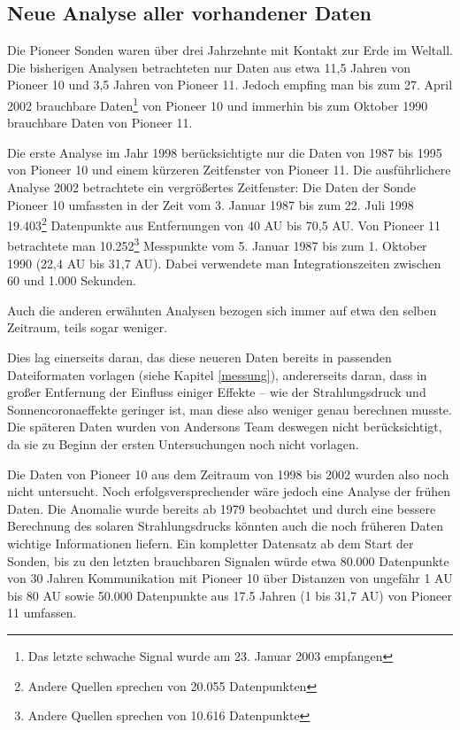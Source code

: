 \subsection{Neue Analyse aller vorhandener Daten}\label{daten}
Die Pioneer Sonden waren über drei Jahrzehnte mit Kontakt zur Erde im Weltall. Die bisherigen Analysen betrachteten nur Daten aus etwa 11,5 Jahren von Pioneer 10 und 3,5 Jahren von Pioneer 11. Jedoch empfing man bis zum 27. April 2002 brauchbare Daten\footnote{Das letzte schwache Signal wurde am 23. Januar 2003 empfangen} von Pioneer 10 und immerhin bis zum Oktober 1990 brauchbare Daten von Pioneer 11.

Die erste Analyse im Jahr 1998 berücksichtigte nur die Daten von 1987 bis 1995 von Pioneer 10 und einem kürzeren Zeitfenster von Pioneer 11. Die ausführlichere Analyse 2002 betrachtete ein vergrößertes Zeitfenster: Die Daten der Sonde Pioneer 10 umfassten in der Zeit vom 3. Januar 1987 bis zum 22. Juli 1998 19.403\footnote{Andere Quellen sprechen von 20.055 Datenpunkten\cite{Turyshev2004}} Datenpunkte aus Entfernungen von 40 AU bis 70,5 AU. Von Pioneer 11 betrachtete man 10.252\footnote{Andere Quellen sprechen von 10.616 Datenpunkte\cite{Turyshev2004}} Messpunkte vom 5. Januar 1987 bis zum 1. Oktober 1990 (22,4 AU bis 31,7 AU). %
Dabei verwendete man Integrationszeiten zwischen 60 und 1.000 Sekunden\cite{Turyshev2004}.

Auch die anderen erwähnten Analysen bezogen sich immer auf etwa den selben Zeitraum, teils sogar weniger.

Dies lag einerseits daran, das diese neueren Daten bereits in passenden Dateiformaten vorlagen (siehe Kapitel \ref{messung}), andererseits daran, dass in großer Entfernung der Einfluss einiger Effekte – wie der Strahlungsdruck und Sonnencoronaeffekte geringer ist, man diese also weniger genau berechnen musste\cite{Nieto2005}. Die späteren Daten wurden von Andersons Team deswegen nicht berücksichtigt, da sie zu Beginn der ersten Untersuchungen noch nicht vorlagen. %

Die Daten von Pioneer 10 aus dem Zeitraum von 1998 bis 2002 wurden also noch nicht untersucht.
Noch erfolgsversprechender wäre jedoch eine Analyse der frühen Daten. Die Anomalie wurde bereits ab 1979 beobachtet und durch eine bessere Berechnung des solaren Strahlungsdrucks könnten auch die noch früheren Daten wichtige Informationen liefern.
Ein kompletter Datensatz ab dem Start der Sonden, bis zu den letzten brauchbaren Signalen würde etwa 80.000 Datenpunkte von 30 Jahren Kommunikation mit Pioneer 10  über Distanzen von ungefähr 1 AU bis 80 AU sowie 50.000 Datenpunkte aus 17.5 Jahren (1 bis 31,7 AU) von Pioneer 11 umfassen\cite{Turyshev2004}.

